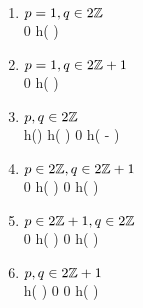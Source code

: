\begin{enumerate}[(1)]
	\item $p=1,q\in2\mathbb{Z}$\\
\hspace*{0cm}\commonShift\mytableThreeTwo	%
{}		{}
{\yipx}			{0}
{\yimx}			{h\left(  \right)}
	\item $p=1,q\in2\mathbb{Z}+1$\\
\hspace*{0cm}\commonShift\mytableThreeTwo	%
{}		{}
{\yipx}			{0}
{\yimx}			{h\left(  \right)}
	\item $p,q\in2\mathbb{Z}$\\
\hspace*{-0cm}\commonShift\mytable	%
{}		{\yipy}				{\yimy}
{\yipx}	{h\left(\right)} 	{h\left(  \right)}
{\yipx}	{0} 					{h\left( - \right)}
\item $p\in2\mathbb{Z},q\in2\mathbb{Z}+1$\\
\commonShift\mytable	%
{}		{\yipy}{\yimy}
{\yipx} {0}		{h\left(  \right)}
{\yimx} {0} {h\left(  \right)}
\item $p\in2\mathbb{Z}+1,q\in2\mathbb{Z}$\\
\commonShift\mytable	%
{}		{\yipy}		{\yimy}
{\yipx}			{0} 			{h\left(  \right)}	
{\yimx} 			{0} 			{h\left(  \right)}
\item $p,q\in2\mathbb{Z}+1$\\
\commonShift\mytable	%
{}		{\yipy}	{\yimy}
{{\yipx}}		{h\left(  \right)}			{0}
{{\yimx}}		{0}	{h\left(  \right)}	
\end{enumerate}
